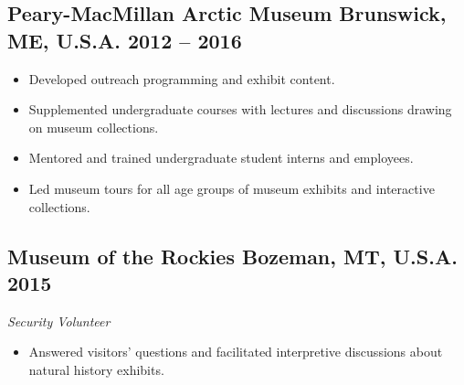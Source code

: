 \subsection*{\textbf{Peary-MacMillan Arctic Museum} \hspace{15pt} Brunswick, ME, U.S.A. \hfill 2012 -- 2016}
\begin{itemize}
	\item Developed outreach programming and exhibit content.
	\item Supplemented undergraduate courses with lectures and discussions drawing on museum collections.
	\item Mentored and trained undergraduate student interns and employees.
\end{itemize}

\begin{itemize}
	\item Led museum tours for all age groups of museum exhibits and interactive collections.
\end{itemize}

\subsection*{\textbf{Museum of the Rockies} \hspace{15pt} Bozeman, MT, U.S.A. \hfill 2015}
\textit{Security Volunteer}
\begin{itemize}
	\item Answered visitors' questions and facilitated interpretive discussions about natural history exhibits.
\end{itemize}